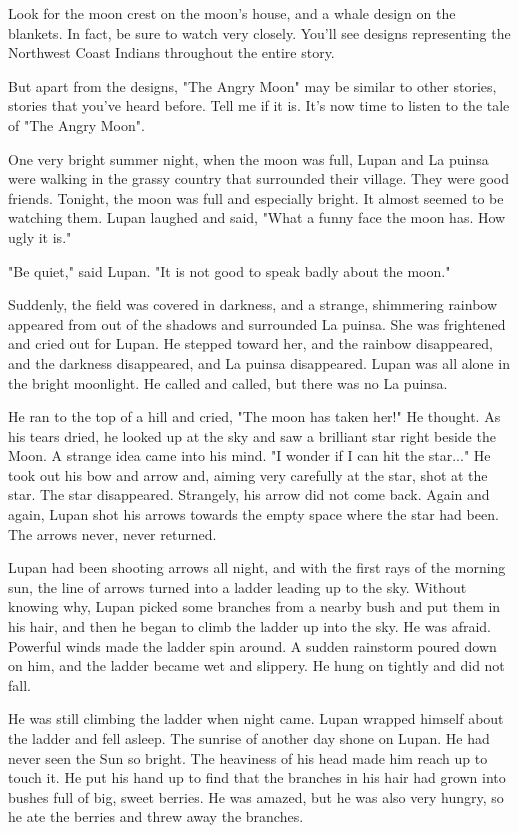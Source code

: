 Look for the moon crest on the moon's house, and a whale design on the blankets. In fact, be sure to watch very closely. You'll see designs representing the Northwest Coast Indians throughout the entire story.

But apart from the designs, "The Angry Moon" may be similar to other stories, stories that you've heard before. Tell me if it is. It's now time to listen to the tale of "The Angry Moon".

One very bright summer night, when the moon was full, Lupan and La puinsa were walking in the grassy country that surrounded their village. They were good friends. Tonight, the moon was full and especially bright. It almost seemed to be watching them. Lupan laughed and said, "What a funny face the moon has. How ugly it is."

"Be quiet," said Lupan. "It is not good to speak badly about the moon."

Suddenly, the field was covered in darkness, and a strange, shimmering rainbow appeared from out of the shadows and surrounded La puinsa. She was frightened and cried out for Lupan. He stepped toward her, and the rainbow disappeared, and the darkness disappeared, and La puinsa disappeared. Lupan was all alone in the bright moonlight. He called and called, but there was no La puinsa.

He ran to the top of a hill and cried, "The moon has taken her!" He thought. As his tears dried, he looked up at the sky and saw a brilliant star right beside the Moon. A strange idea came into his mind. "I wonder if I can hit the star..." He took out his bow and arrow and, aiming very carefully at the star, shot at the star. The star disappeared. Strangely, his arrow did not come back. Again and again, Lupan shot his arrows towards the empty space where the star had been. The arrows never, never returned.

Lupan had been shooting arrows all night, and with the first rays of the morning sun, the line of arrows turned into a ladder leading up to the sky. Without knowing why, Lupan picked some branches from a nearby bush and put them in his hair, and then he began to climb the ladder up into the sky. He was afraid. Powerful winds made the ladder spin around. A sudden rainstorm poured down on him, and the ladder became wet and slippery. He hung on tightly and did not fall.

He was still climbing the ladder when night came. Lupan wrapped himself about the ladder and fell asleep. The sunrise of another day shone on Lupan. He had never seen the Sun so bright. The heaviness of his head made him reach up to touch it. He put his hand up to find that the branches in his hair had grown into bushes full of big, sweet berries. He was amazed, but he was also very hungry, so he ate the berries and threw away the branches.

